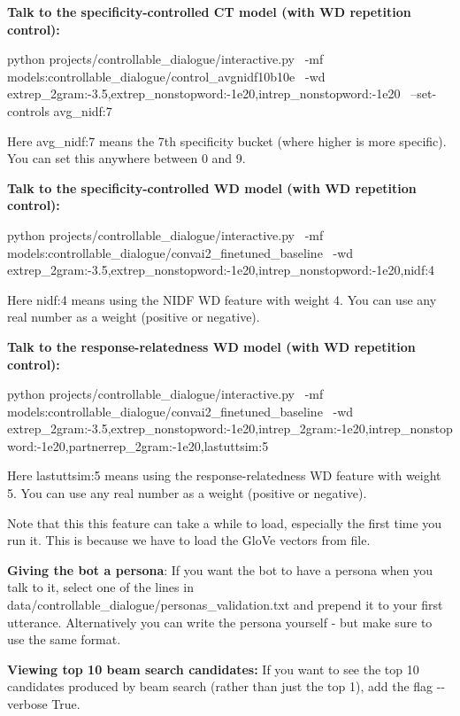 {\bfseries Talk to the specificity-\/controlled CT model (with WD repetition control)\+:} \begin{DoxyVerb}python projects/controllable_dialogue/interactive.py \
-mf models:controllable_dialogue/control_avgnidf10b10e \
-wd extrep_2gram:-3.5,extrep_nonstopword:-1e20,intrep_nonstopword:-1e20 \
--set-controls avg_nidf:7
\end{DoxyVerb}


Here {\ttfamily avg\+\_\+nidf\+:7} means the 7th specificity bucket (where higher is more specific). You can set this anywhere between 0 and 9.

{\bfseries Talk to the specificity-\/controlled WD model (with WD repetition control)\+:} \begin{DoxyVerb}python projects/controllable_dialogue/interactive.py \
-mf models:controllable_dialogue/convai2_finetuned_baseline \
-wd extrep_2gram:-3.5,extrep_nonstopword:-1e20,intrep_nonstopword:-1e20,nidf:4
\end{DoxyVerb}


Here {\ttfamily nidf\+:4} means using the N\+I\+DF WD feature with weight 4. You can use any real number as a weight (positive or negative).

{\bfseries Talk to the response-\/relatedness WD model (with WD repetition control)\+:} \begin{DoxyVerb}python projects/controllable_dialogue/interactive.py \
-mf models:controllable_dialogue/convai2_finetuned_baseline \
-wd extrep_2gram:-3.5,extrep_nonstopword:-1e20,intrep_2gram:-1e20,intrep_nonstopword:-1e20,partnerrep_2gram:-1e20,lastuttsim:5
\end{DoxyVerb}


Here {\ttfamily lastuttsim\+:5} means using the response-\/relatedness WD feature with weight 5. You can use any real number as a weight (positive or negative).

Note that this this feature can take a while to load, especially the first time you run it. This is because we have to load the Glo\+Ve vectors from file.

{\bfseries Giving the bot a persona}\+: If you want the bot to have a persona when you talk to it, select one of the lines in {\ttfamily data/controllable\+\_\+dialogue/personas\+\_\+validation.\+txt} and prepend it to your first utterance. Alternatively you can write the persona yourself -\/ but make sure to use the same format.

{\bfseries Viewing top 10 beam search candidates\+:} If you want to see the top 10 candidates produced by beam search (rather than just the top 1), add the flag {\ttfamily -\/-\/verbose True}.

